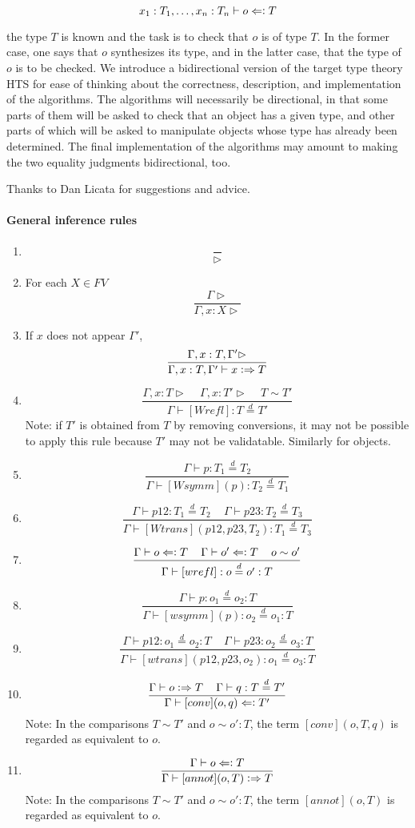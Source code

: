 \documentclass[11pt]{article}
\newcommand{\eqd}{\stackrel{d}{=}}
\newcommand{\spc}{{\,\,\,\,\,\,\,}}
\newcommand{\synth}{\vcentcolon\Rightarrow}
\newcommand{\force}{\Leftarrow\vcentcolon}
\begin{document}
$$x_1:T_1,\dots,x_n:T_n\vdash o \force T$$

the type $T$ is known and the task is to check that $o$ is of type $T$.  In the
former case, one says that $o$ synthesizes its type, and in the latter case,
that the type of $o$ is to be checked.  We introduce a bidirectional version of
the target type theory HTS for ease of thinking about the correctness,
description, and implementation of the algorithms.  The algorithms will
necessarily be directional, in that some parts of them will be asked to check
that an object has a given type, and other parts of which will be asked to
manipulate objects whose type has already been determined.  The final
implementation of the algorithms may amount to making the two equality
judgments bidirectional, too.

Thanks to Dan Licata for suggestions and advice.

\paragraph{General inference rules} 

\begin{enumerate}
\item 
$$\frac{}{\rhd}$$
\item For each $X\in FV$
$$\frac{\Gamma\rhd}{\Gamma, x:X\rhd}$$

\item If $x$ does not appear $\Gamma'$,
$$\frac{\Gamma, x:T, \Gamma'\rhd}{\Gamma, x:T, \Gamma'\vdash x \synth T}$$

\item 
$$\frac{\Gamma, x:T\rhd\spc \Gamma, x:T'\rhd\spc T\sim T'}{\Gamma\vdash [Wrefl]: T\eqd T'}$$
Note: if $T'$ is obtained from $T$ by removing conversions, it may not be possible to apply
this rule because $T'$ may not be validatable.  Similarly for objects.
\item 
$$\frac{\Gamma\vdash p:T_1\eqd T_2}{\Gamma\vdash [Wsymm](p):T_2\eqd T_1}$$
\item 
$$\frac{\Gamma\vdash p12:T_1\eqd T_2\spc\Gamma\vdash p23:T_2\eqd T_3}{\Gamma\vdash [Wtrans](p12,p23,T_2): T_1\eqd T_3}$$
\item 
$$\frac{\Gamma\vdash o \force T\spc\Gamma\vdash o' \force T \spc o \sim o'}{\Gamma\vdash [wrefl]:o\eqd o':T}$$
\item 
$$\frac{\Gamma\vdash p:o_1\eqd o_2:T}{\Gamma\vdash [wsymm](p):o_2\eqd o_1:T}$$
\item 
$$\frac{\Gamma\vdash p12:o_1\eqd o_2:T\spc\Gamma\vdash p23:o_2\eqd o_3:T}{\Gamma\vdash [wtrans](p12,p23,o_2):o_1\eqd o_3:T}$$
\item 
$$\frac{\Gamma\vdash o \synth T\spc \Gamma\vdash q : T\eqd T'}{\Gamma\vdash [conv](o,q) \force T'}$$
Note: In the comparisons $T\sim T'$ and $o\sim o':T$, the term $[conv](o,T,q)$ is regarded as equivalent to $o$.
\item 
$$\frac{\Gamma\vdash o \force T}{\Gamma\vdash [annot](o,T) \synth T}$$
Note: In the comparisons $T\sim T'$ and $o\sim o':T$, the term $[annot](o,T)$ is regarded as equivalent to $o$.

\end{enumerate}
\end{document}
